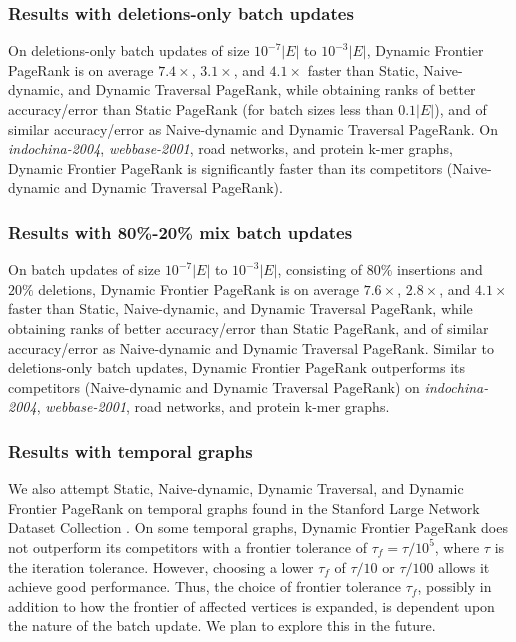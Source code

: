 \subsubsection{Results with deletions-only batch updates}

On deletions-only batch updates of size $10^{-7}|E|$ to $10^{-3}|E|$, Dynamic Frontier PageRank is on average $7.4\times$, $3.1\times$, and $4.1\times$ faster than Static, Naive-dynamic, and Dynamic Traversal PageRank, while obtaining ranks of better accuracy/error than Static PageRank (for batch sizes less than $0.1|E|$), and of similar accuracy/error as Naive-dynamic and Dynamic Traversal PageRank. On \textit{indochina-2004}, \textit{webbase-2001}, road networks, and protein k-mer graphs, Dynamic Frontier PageRank is significantly faster than its competitors (Naive-dynamic and Dynamic Traversal PageRank).


\subsubsection{Results with 80\%-20\% mix batch updates}

On batch updates of size $10^{-7}|E|$ to $10^{-3}|E|$, consisting of $80\%$ insertions and $20\%$ deletions, Dynamic Frontier PageRank is on average $7.6\times$, $2.8\times$, and $4.1\times$ faster than Static, Naive-dynamic, and Dynamic Traversal PageRank, while obtaining ranks of better accuracy/error than Static PageRank, and of similar accuracy/error as Naive-dynamic and Dynamic Traversal PageRank. Similar to deletions-only batch updates, Dynamic Frontier PageRank outperforms its competitors (Naive-dynamic and Dynamic Traversal PageRank) on \textit{indochina-2004}, \textit{webbase-2001}, road networks, and protein k-mer graphs.


\subsubsection{Results with temporal graphs}

We also attempt Static, Naive-dynamic, Dynamic Traversal, and Dynamic Frontier PageRank on temporal graphs found in the Stanford Large Network Dataset Collection \cite{snap14}. On some temporal graphs, Dynamic Frontier PageRank does not outperform its competitors with a frontier tolerance of $\tau_f = \tau / 10^5$, where $\tau$ is the iteration tolerance. However, choosing a lower $\tau_f$ of $\tau / 10$ or $\tau / 100$ allows it achieve good performance. Thus, the choice of frontier tolerance $\tau_f$, possibly in addition to how the frontier of affected vertices is expanded, is dependent upon the nature of the batch update. We plan to explore this in the future.



